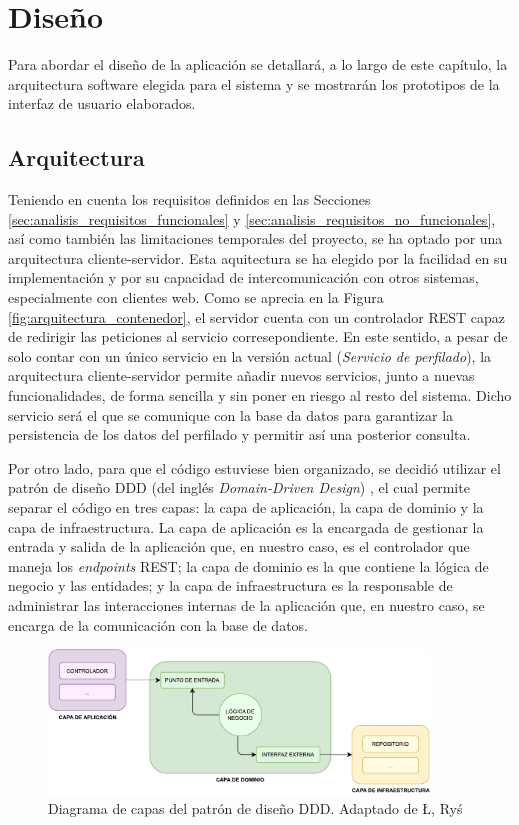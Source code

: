 \chapter{Diseño}
\label{chap:diseño}

Para abordar el diseño de la aplicación se detallará, a lo largo de este capítulo, la arquitectura software elegida para el sistema
y se mostrarán los prototipos de la interfaz de usuario elaborados.

\section{Arquitectura}
\label{sec:diseño_arquitectura}

Teniendo en cuenta los requisitos definidos en las Secciones \ref{sec:analisis_requisitos_funcionales} y \ref{sec:analisis_requisitos_no_funcionales},
así como también las limitaciones temporales del proyecto, se ha optado por una arquitectura cliente-servidor. Esta aquitectura se ha elegido
por la facilidad en su implementación y por su capacidad de intercomunicación con otros sistemas, especialmente con clientes web. Como
se aprecia en la Figura \ref{fig:arquitectura_contenedor}, el servidor cuenta con un controlador REST capaz de redirigir las peticiones al servicio
corresepondiente. En este sentido, a pesar de solo contar con un único servicio en la versión actual (\textit{Servicio de perfilado}),
la arquitectura cliente-servidor permite añadir nuevos servicios, junto a nuevas funcionalidades, de forma sencilla y sin poner en riesgo al resto del sistema.
Dicho servicio será el que se comunique con la base da datos para garantizar la persistencia de los datos del perfilado y permitir así
una posterior consulta.

\bigskip
Por otro lado, para que el código estuviese bien organizado, se decidió utilizar el patrón de diseño DDD (del inglés \textit{Domain-Driven Design}) \cite{ddd}, el cual
permite separar el código en tres capas: la capa de aplicación, la capa de dominio y la capa de infraestructura. La capa de aplicación es la encargada de gestionar
la entrada y salida de la aplicación que, en nuestro caso, es el controlador que maneja los \textit{endpoints} REST; la capa de dominio es la que contiene la lógica
de negocio y las entidades; y la capa de infraestructura es la responsable de administrar las interacciones internas de la aplicación que, en nuestro
caso, se encarga de la comunicación con la base de datos.

\begin{figure}[H]
	\centering
	\includegraphics[width=0.9\textwidth]{diagramas/ddd.pdf}
	\caption{Diagrama de capas del patrón de diseño DDD. Adaptado de Ł, Ryś \cite{dddblog}}
	\label{fig:ddd}
\end{figure}

